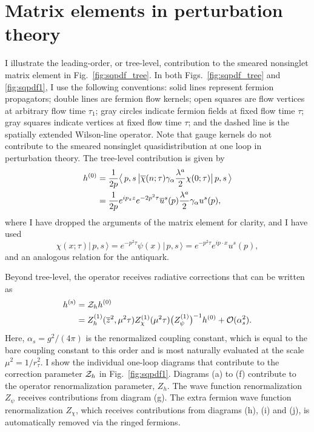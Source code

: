\section{\label{sec:pertth}Matrix elements in perturbation theory}

I illustrate the leading-order, or tree-level, contribution to the smeared nonsinglet matrix element in Fig.~\ref{fig:sqpdf_tree}. In both Figs.~\ref{fig:sqpdf_tree} and \ref{fig:sqpdf1}, I use the following conventions: solid lines represent fermion propagators; double lines are fermion flow kernels; open squares are flow vertices at arbitrary flow time $\tau_1$; gray circles indicate fermion fields at fixed flow time $\tau$; gray squares indicate vertices at fixed flow time $\tau$; and the dashed line is the spatially extended Wilson-line operator.
Note that gauge kernels do not contribute to the smeared nonsinglet quasidistribution at one loop in perturbation theory. The tree-level contribution is given by
\begin{align}
h^{(0)} = {} & \frac{1}{2p}\big\langle  \,p,s \,\big| \overline{\chi}(n;\tau)\gamma_\alpha\frac{\lambda^a}{2}\chi(0;\tau) \big|\, p,s \, \big\rangle \nonumber\\
= {} & \frac{1}{2p}e^{ip_zz} e^{-2p^2\tau}\overline{u}^s(p)\frac{\lambda^a}{2}\gamma_\alpha u^s(p),
\end{align}
where I have dropped the arguments of the matrix element for clarity, and I have used
\begin{equation}
\chi(x;\tau) \big | \,p,s \,\big\rangle = e^{-p^2\tau}\psi(x)\big | \,p,s \,\big\rangle =e^{-p^2\tau}e^{ip\cdot x}u^s(p),
\end{equation}
and an analogous relation for the antiquark.

Beyond tree-level, the operator receives radiative corrections that can be written as
\begin{align}
h^{(\mathrm{s})}= {} & {\cal Z}_h h^{(0)} \nonumber\\
= {} & Z_h^{(1)}(\overline{z}^2,\mu^2\tau) Z_\chi^{(1)}(\mu^2\tau) \big(Z_\psi^{(1)}\big)^{-1}h^{(0)}+{\cal O}(\alpha_s^2). \label{eq:matchrel}
\end{align}
Here, $\alpha_s = g^2/(4\pi)$ is the renormalized coupling constant, which is equal to the bare coupling constant to this order and is most naturally evaluated at the scale $\mu^2 = 1/r_\tau^2$. I show the individual one-loop diagrams that contribute to the correction parameter ${\cal Z}_h$ in Fig.~\ref{fig:sqpdf1}. Diagrams (a) to (f) contribute to the operator renormalization parameter, $Z_h$. The wave function renormalization $Z_\psi$ receives contributions from diagram (g). The extra fermion wave function renormalization $Z_\chi$, which receives contributions from diagrams (h), (i) and (j), is automatically removed via the ringed fermions.

